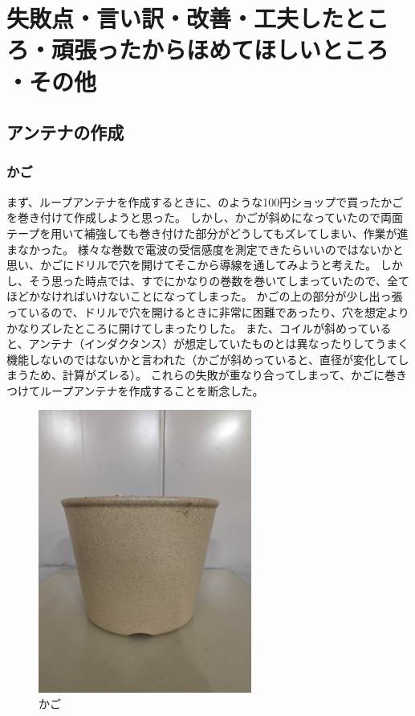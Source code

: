 \documentclass[report.tex]{subfiles}
\begin{document}
\section{失敗点・言い訳・改善・工夫したところ・頑張ったからほめてほしいところ ・その他} \label{sec:失敗点}

\subsection{アンテナの作成}

\subsubsection{かご}

まず、ループアンテナを作成するときに、のような100円ショップで買ったかごを巻き付けて作成しようと思った。
しかし、かごが斜めになっていたので両面テープを用いて補強しても巻き付けた部分がどうしてもズレてしまい、作業が進まなかった。
様々な巻数で電波の受信感度を測定できたらいいのではないかと思い、かごにドリルで穴を開けてそこから導線を通してみようと考えた。
しかし、そう思った時点では、すでにかなりの巻数を巻いてしまっていたので、全てほどかなければいけないことになってしまった。
かごの上の部分が少し出っ張っているので、ドリルで穴を開けるときに非常に困難であったり、穴を想定よりかなりズレたところに開けてしまったりした。
また、コイルが斜めっていると、アンテナ（インダクタンス）が想定していたものとは異なったりしてうまく機能しないのではないかと言われた（かごが斜めっていると、直径が変化してしまうため、計算がズレる）。
これらの失敗が重なり合ってしまって、かごに巻きつけてループアンテナを作成することを断念した。

\begin{figure}[H]
	\centering
	\includegraphics[width=7cm]{use/kago.jpg}
	\caption{かご}
	\label{fig:kago}
\end{figure}
\end{document}

